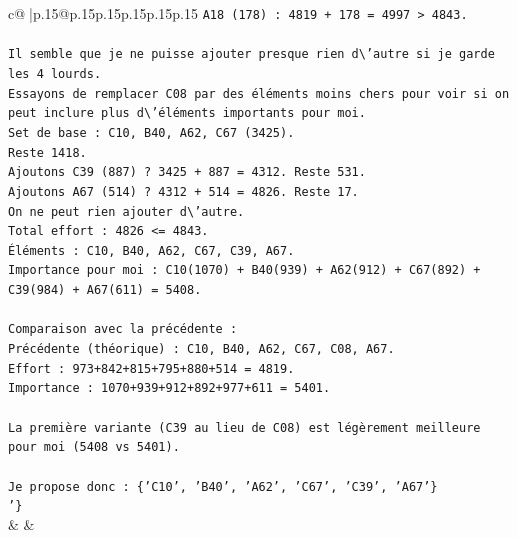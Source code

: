 \documentclass{article}
\begin{document}
{\begin{supertabular}{c@{$\;$}|p{.15\linewidth}@{}p{.15\linewidth}p{.15\linewidth}p{.15\linewidth}p{.15\linewidth}p{.15\linewidth}}
{{{\texttt{A18 (178) : 4819 + 178 = 4997 > 4843.} \\
\\ 
\texttt{Il semble que je ne puisse ajouter presque rien d\textbackslash{}'autre si je garde les 4 lourds.} \\
\texttt{Essayons de remplacer C08 par des éléments moins chers pour voir si on peut inclure plus d\textbackslash{}'éléments importants pour moi.} \\
\texttt{Set de base : C10, B40, A62, C67 (3425).} \\
\texttt{Reste 1418.} \\
\texttt{Ajoutons C39 (887) ? 3425 + 887 = 4312. Reste 531.} \\
\texttt{Ajoutons A67 (514) ? 4312 + 514 = 4826. Reste 17.} \\
\texttt{On ne peut rien ajouter d\textbackslash{}'autre.} \\
\texttt{Total effort : 4826 <= 4843.} \\
\texttt{Éléments : C10, B40, A62, C67, C39, A67.} \\
\texttt{Importance pour moi : C10(1070) + B40(939) + A62(912) + C67(892) + C39(984) + A67(611) = 5408.} \\
\\ 
\texttt{Comparaison avec la précédente :} \\
\texttt{Précédente (théorique) : C10, B40, A62, C67, C08, A67.} \\
\texttt{Effort : 973+842+815+795+880+514 = 4819.} \\
\texttt{Importance : 1070+939+912+892+977+611 = 5401.} \\
\\ 
\texttt{La première variante (C39 au lieu de C08) est légèrement meilleure pour moi (5408 vs 5401).} \\
\\ 
\texttt{Je propose donc : \{'C10', 'B40', 'A62', 'C67', 'C39', 'A67'\}} \\
\texttt{'\}} \\
            }
        }
    }
    & & \\ \\


\end{supertabular}}
\end{document}
